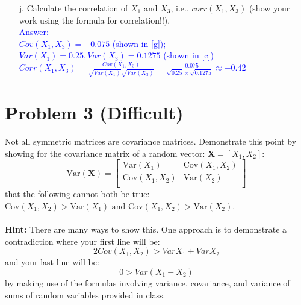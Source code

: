 \documentclass[letterpaper, 11pt]{article}
\begin{document}
\begin{itemize}
\item[j.] Calculate the correlation of $X_1$ and $X_3$, i.e., $corr(X_1, X_3)$ (show your work using the formula for correlation!!).\\
\textcolor{blue}{Answer: \\
$Cov(X_1, X_3) = -0.075$ (shown in [g]); $Var(X_1) = 0.25, Var(X_3) = 0.1275$ (shown in [c])\\
$Corr(X_1, X_3) = \frac{Cov(X_1, X_3)}{\sqrt{Var(X_1)}\sqrt{Var(X_3)}} = \frac{-0.075}{\sqrt{0.25} \times \sqrt{0.1275}} \approx -0.42$
}\\


\end{itemize}

\section*{Problem 3 (Difficult)}

Not all symmetric matrices are covariance matrices.  Demonstrate this point by showing for the covariance matrix of a random vector: $\textbf{X}=\left[X_1,X_2\right]$:
\[
\textrm{Var}(\textbf{X}) = 
 \begin{bmatrix}
  \textrm{Var}(X_1) &  \textrm{Cov}(X_1,X_2)   \\
   \textrm{Cov}(X_1,X_2)  &  \textrm{Var}(X_2)   \\
  \end{bmatrix}
\]
that the following cannot both be true: $\textrm{Cov}(X_1,X_2)>\textrm{Var}(X_1) \mbox{ and } \textrm{Cov}(X_1,X_2)>\textrm{Var}(X_2)$. \\
\\
{\bf Hint:} There are many ways to show this.  One approach is to demonstrate a contradiction where your first line will be:
\begin{equation*}
	2Cov(X_1,X_2)>VarX_1+ VarX_2
\end{equation*}
and your last line will be:\\
\begin{equation*}
	0> Var(X_1 - X_2)
\end{equation*}
by making use of the formulas involving variance, covariance, and variance of sums of random variables provided in class.
\end{document}
